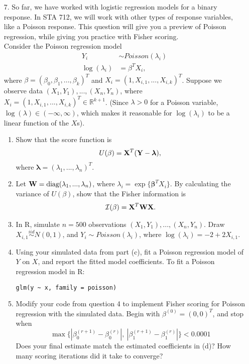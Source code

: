 \documentclass[11pt]{article}
\begin{document}
\begin{enumerate}
\item[7.] So far, we have worked with logistic regression models for a binary response. In STA 712, we will work with other types of response variables, like a Poisson response. This question will give you a preview of Poisson regression, while giving you practice with Fisher scoring. \\

Consider the Poisson regression model
\begin{align*}
Y_i &\sim Poisson(\lambda_i) \\
\log(\lambda_i) &= \beta^T X_i,
\end{align*}
where $\beta = (\beta_0, \beta_1, ..., \beta_k)^T$ and $X_i = (1, X_{i,1},...,X_{i,k})^T$. Suppose we observe data $(X_1, Y_1),...,(X_n, Y_n)$, where $X_i = (1, X_{i,1},...,X_{i,k})^T \in \mathbb{R}^{k+1}$. (Since $\lambda > 0$ for a Poisson variable, $\log(\lambda) \in (-\infty, \infty)$, which makes it reasonable for $\log(\lambda_i)$ to be a linear function of the $X$s).

\begin{enumerate}
\item Show that the score function is
\begin{align*}
U(\beta) = \mathbf{X}^T({\bf Y} - \bm{\lambda}),
\end{align*}
where $\bm{\lambda} = (\lambda_1,...,\lambda_n)^T$.

\item Let ${\bf W} = \text{diag}(\lambda_1,...,\lambda_n)$, where $\lambda_i = \exp\{ \bm{\beta}^T X_i \}$. By calculating the variance of $U(\beta)$, show that the Fisher information is
\begin{align*}
\mathcal{I}(\beta) = {\bf X}^T {\bf W} {\bf X}.
\end{align*}

\item In R, simulate $n = 500$ observations $(X_1, Y_1),...,(X_n, Y_n)$. Draw $X_{i,1} \overset{iid}{\sim} N(0, 1)$, and $Y_i \sim Poisson(\lambda_i)$, where $\log(\lambda_i) = -2 + 2 X_{i,1}$. 

\item Using your simulated data from part (c), fit a Poisson regression model of $Y$ on $X$, and report the fitted model coefficients. To fit a Poisson regression model in R: 

\begin{verbatim}
glm(y ~ x, family = poisson)
\end{verbatim}

\item Modify your code from question 4 to implement Fisher scoring for Poisson regression with the simulated data. Begin with $\beta^{(0)} = (0, 0)^T$, and stop when
$$\max \{ |\beta_0^{(r+1)} - \beta_0^{(r)}|, \ |\beta_1^{(r+1)} - \beta_1^{(r)}| \} < 0.0001$$
Does your final estimate match the estimated coefficients in (d)? How many scoring iterations did it take to converge?
\end{enumerate}

\end{enumerate}
\end{document}
